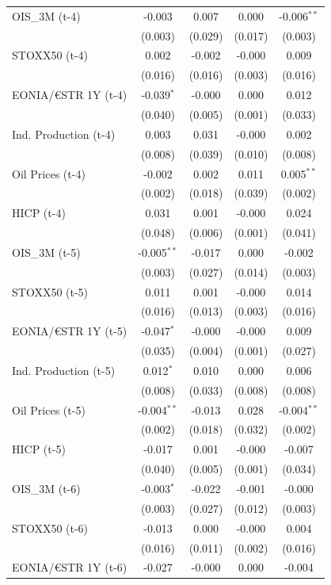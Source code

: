 \begin{longtable}[t]{lcccc}
OIS\_3M (t-4) & -0.003 & 0.007 & 0.000 & -0.006$^{**}$\\
 & (0.003) & (0.029) & (0.017) & (0.003)\\
STOXX50 (t-4) & 0.002 & -0.002 & -0.000 & 0.009\\
 & (0.016) & (0.016) & (0.003) & (0.016)\\
EONIA/€STR 1Y (t-4) & -0.039$^{*}$ & -0.000 & 0.000 & 0.012\\
 & (0.040) & (0.005) & (0.001) & (0.033)\\
Ind. Production (t-4) & 0.003 & 0.031 & -0.000 & 0.002\\
 & (0.008) & (0.039) & (0.010) & (0.008)\\
Oil Prices (t-4) & -0.002 & 0.002 & 0.011 & 0.005$^{**}$\\
 & (0.002) & (0.018) & (0.039) & (0.002)\\
HICP (t-4) & 0.031 & 0.001 & -0.000 & 0.024\\
 & (0.048) & (0.006) & (0.001) & (0.041)\\
OIS\_3M (t-5) & -0.005$^{**}$ & -0.017 & 0.000 & -0.002\\
 & (0.003) & (0.027) & (0.014) & (0.003)\\
STOXX50 (t-5) & 0.011 & 0.001 & -0.000 & 0.014\\
 & (0.016) & (0.013) & (0.003) & (0.016)\\
EONIA/€STR 1Y (t-5) & -0.047$^{*}$ & -0.000 & -0.000 & 0.009\\
 & (0.035) & (0.004) & (0.001) & (0.027)\\
Ind. Production (t-5) & 0.012$^{*}$ & 0.010 & 0.000 & 0.006\\
 & (0.008) & (0.033) & (0.008) & (0.008)\\
Oil Prices (t-5) & -0.004$^{**}$ & -0.013 & 0.028 & -0.004$^{**}$\\
 & (0.002) & (0.018) & (0.032) & (0.002)\\
HICP (t-5) & -0.017 & 0.001 & -0.000 & -0.007\\
 & (0.040) & (0.005) & (0.001) & (0.034)\\
OIS\_3M (t-6) & -0.003$^{*}$ & -0.022 & -0.001 & -0.000\\
 & (0.003) & (0.027) & (0.012) & (0.003)\\
STOXX50 (t-6) & -0.013 & 0.000 & -0.000 & 0.004\\
 & (0.016) & (0.011) & (0.002) & (0.016)\\
EONIA/€STR 1Y (t-6) & -0.027 & -0.000 & 0.000 & -0.004\\

\end{longtable}
